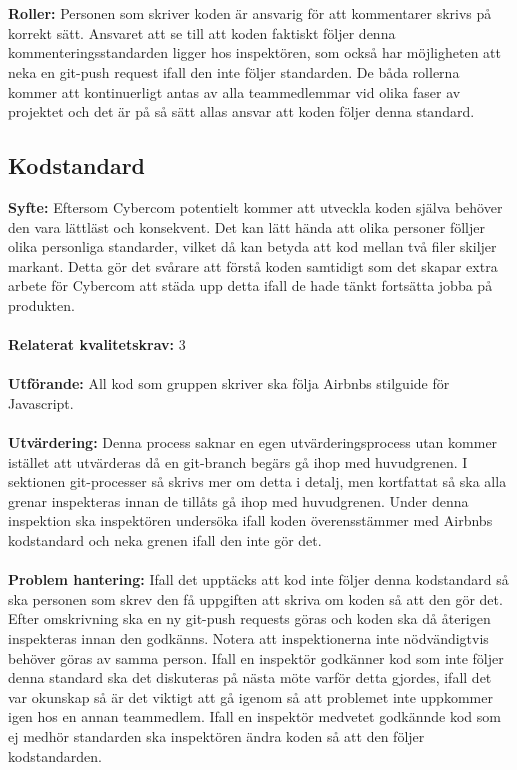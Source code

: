 \documentclass[10pt]{article}
\begin{document}
	\\\\
	\textbf{Roller:} Personen som skriver koden är ansvarig för att kommentarer skrivs på korrekt sätt. Ansvaret att se till att koden faktiskt följer denna kommenteringsstandarden ligger hos inspektören, som också har möjligheten att neka en git-push request ifall den inte följer standarden. De båda rollerna kommer att kontinuerligt antas av alla teammedlemmar vid olika faser av projektet och det är på så sätt allas ansvar att koden följer denna standard.
	\\
	
	\subsection{Kodstandard}
	\textbf{Syfte:}	Eftersom Cybercom potentielt kommer att utveckla koden själva behöver den vara lättläst och konsekvent. Det kan lätt hända att olika personer fölljer olika personliga standarder, vilket då kan betyda att kod mellan två filer skiljer markant. Detta gör det svårare att förstå koden samtidigt som det skapar extra arbete för Cybercom att städa upp detta ifall de hade tänkt fortsätta jobba på produkten.
	\\\\
	\textbf{Relaterat kvalitetskrav:} 3
	\\\\
	\textbf{Utförande:} All kod som gruppen skriver ska följa Airbnbs stilguide för Javascript\cite{bib-airbnb}.
	\\\\
	\textbf{Utvärdering:} Denna process saknar en egen utvärderingsprocess utan kommer istället att utvärderas då en git-branch begärs gå ihop med huvudgrenen. I sektionen git-processer så skrivs mer om detta i detalj, men kortfattat så ska alla grenar inspekteras innan de tillåts gå ihop med huvudgrenen. Under denna inspektion ska inspektören undersöka ifall koden överensstämmer med Airbnbs kodstandard och neka grenen ifall den inte gör det.
	\\\\
	\textbf{Problem hantering:} Ifall det upptäcks att kod inte följer denna kodstandard så ska personen som skrev den få uppgiften att skriva om koden så att den gör det. Efter omskrivning ska en ny git-push requests göras och koden ska då återigen inspekteras innan den godkänns. Notera att inspektionerna inte nödvändigtvis behöver göras av samma person.
	Ifall en inspektör godkänner kod som inte följer denna standard ska det diskuteras på nästa möte varför detta gjordes, ifall det var okunskap så är det viktigt att gå igenom så att problemet inte uppkommer igen hos en annan teammedlem. Ifall en inspektör medvetet godkännde kod som ej medhör standarden ska inspektören ändra koden så att den följer kodstandarden.
\end{document}
